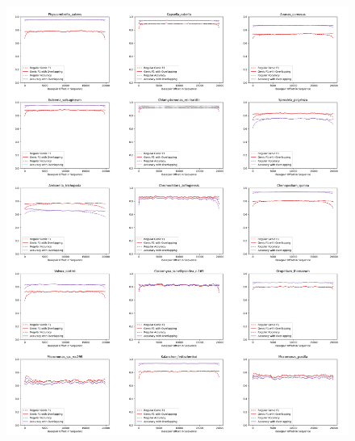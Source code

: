\documentclass{article}
\begin{document}
\begin{figure}[!h]
\centerline{\includegraphics[width=\overlapscale\textwidth]{images/overlapping/montage_plants3}}
\end{figure}
\end{document}
